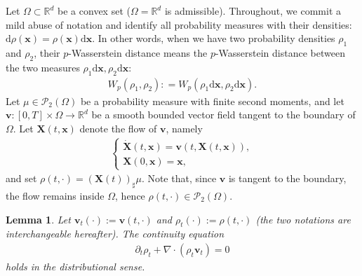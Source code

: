 \documentclass[11pt]{book}
\newtheorem{lemma}[theorem]{Lemma}
\begin{document}
Let $\Omega \subset \mathbb{R}^d$ be a convex set ($\Omega = \mathbb{R}^d$ is admissible). Throughout, we commit a mild abuse of notation and identify all probability measures with their densities: $\text{d}\rho(\mathbf{x}) = \rho(\mathbf{x})\text{d}\mathbf{x}$. In other words, when we have two probability densities $\rho_1$ and $\rho_2$, their $p$-Wasserstein distance means the $p$-Wasserstein distance between the two measures $\rho_1\text{d}\mathbf{x}, \rho_2\text{d}\mathbf{x}$:
\begin{align*}
	W_p(\rho_1,\rho_2): = W_p(\rho_1 \text{d}\mathbf{x}, \rho_2 \text{d}\mathbf{x}).
\end{align*}
Let $\mu \in \mathcal{P}_2(\Omega)$ be a probability measure with finite second moments, and let $\mathbf{v} : [0, T] \times \Omega \to \mathbb{R}^d$ be a smooth bounded vector field tangent to the boundary of $\Omega$. Let $\mathbf{X}(t, \mathbf{x})$ denote the flow of $\mathbf{v}$, namely
\begin{align}\label{eqn:dynamicalOT_velocity_flow}
\begin{cases}
    \dot{\mathbf{X}}(t, \mathbf{x}) = \mathbf{v}(t, \mathbf{X}(t, \mathbf{x})), \\
    \mathbf{X}(0, \mathbf{x}) = \mathbf{x},
\end{cases}
\end{align}
and set $\rho(t,\cdot) = (\mathbf{X}(t))_\sharp \mu$. Note that, since $\mathbf{v}$ is tangent to the boundary, the flow remains inside $\Omega$, hence $\rho(t,\cdot) \in \mathcal{P}_2(\Omega)$.

\begin{lemma}\label{lemma:continuity_eqn}
Let $\mathbf{v}_t(\cdot) := \mathbf{v}(t, \cdot)$ and $\rho_t(\cdot) := \rho(t, \cdot)$ (the two notations are interchangeable hereafter). The continuity equation
\begin{align}\label{eqn:continuity}
\partial_t \rho_t + \nabla\cdot(\rho_t \mathbf{v}_t) = 0
\end{align}
holds in the distributional sense.
\end{lemma}
\end{document}
